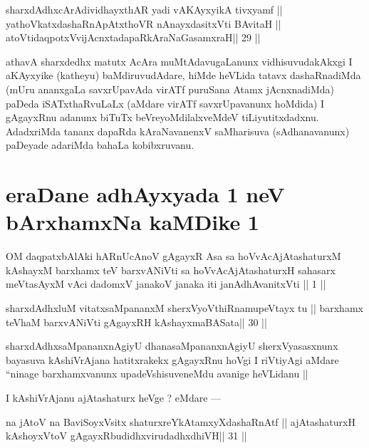\begin{shl}
sharxdAdhxcArAdividhayxthAR yadi vA\s\s KAyxyikA tivxyamf ||
yathoVkatxdashaRnApAtxthoVR nAnayxdasitxVti BAvitaH ||
atoV\s tidaqpotxV\s vijAcnxtadapaRkAraNaGasamxraH\hfill || 29 ||
\end{shl}

\begin{artha}
athavA sharxdedhx matutx AcAra muMtAdavugaLanunx vidhisuvudakAkxgi I aKAyxyike (katheyu) baMdiruvudAdare, hiMde heVLida tatavx dashaRnadiMda (mUru ananxgaLa savxrUpavAda virATf puruSana Atamx jAcnxnadiMda) paDeda iSATxthaRvuLaLx (aMdare virATf savxrUpavanunx hoMdida) I gAgayxRnu adanunx biTuTx beVreyoMdilalxveMdeV tiLiyutitxdadxnu. AdadxriMda tananx dapaRda kAraNavanenxV saMharisuva (sAdhanavanunx) paDeyade adariMda bahaLa kobibxruvanu.
\end{artha}

\section*{eraDane adhAyxyada 1 neV bArxhamxNa kaMDike 1}

\begin{shl}
OM daqpatxbAlAki hARnUcAnoV gAgayxR Asa
sa hoVvAcAjAtashaturxM kAshayxM barxhamx teV barxvANiVti
sa hoVvAcAjAtashaturxH sahasarx meVtasAyxM vAci
dadomxV janakoV janaka iti janAdhAvanitxVti || 1 ||
\end{shl}

\begin{shl}
sharxdAdhxluM vitatxsaMpananxM sherxVyoVthiRnamupeVtayx tu ||
barxhamx teV\s haM barxvANiVti gAgayxRH kAshayxmaBASata\hfill || 30 ||
\end{shl}

\begin{artha}
sharxdAdhxsaMpananxnAgiyU dhanasaMpananxnAgiyU sherxVyasasxnunx bayasuva kAshiVrAjana hatitxrakekx gAgayxRnu hoVgi I riVtiyAgi aMdare ``ninage barxhamxvanunx upadeVshisuveneMdu avanige heVLidanu ||
\end{artha}

\begin{artha}
I kAshiVrAjanu ajAtashaturx heVge ? eMdare ---
\end{artha} 

\begin{shl}
na jAtoV na BaviSoyxV\s sitx shaturxreYkAtamxyXdashaRnAtf ||
ajAtashaturxH kAshoyxV\s toV gAgayxRbudidhxvirudadhxdhiVH\hfill || 31 ||
\end{shl}

